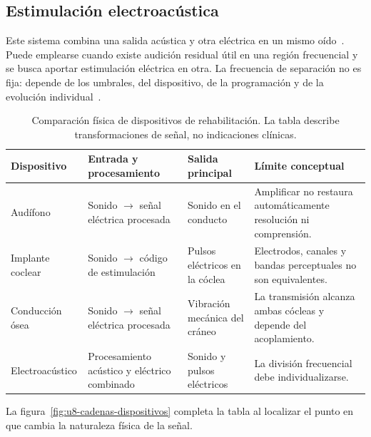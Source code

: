 \subsection{Estimulación electroacústica}
\label{sec:u8-eas}

Este sistema combina una salida acústica y otra eléctrica en un mismo oído~\cite{nidcdCI2024,whoHearing2021}.
Puede emplearse cuando existe audición
residual útil en una región frecuencial y se busca aportar estimulación
eléctrica en otra. La frecuencia de separación no es fija: depende de los
umbrales, del dispositivo, de la programación y de la evolución individual~\cite{nidcdCI2024,whoHearing2021}.

\begin{table}[htbp]
    \centering
    \caption{Comparación física de dispositivos de rehabilitación. La tabla
    describe transformaciones de señal, no indicaciones clínicas.}
    \label{tab:u8-dispositivos}
    \small
    \setlength{\tabcolsep}{3pt}
    \begin{tabular}{
        >{\raggedright\arraybackslash}p{}
        >{\raggedright\arraybackslash}p{}
        >{\raggedright\arraybackslash}p{}
        >{\raggedright\arraybackslash}p{}}
        \hline
        \textbf{Dispositivo} & \textbf{Entrada y procesamiento} &
        \textbf{Salida principal} & \textbf{Límite conceptual} \\
        \hline
        Audífono &
        Sonido \(\rightarrow\) señal eléctrica procesada &
        Sonido en el conducto &
        Amplificar no restaura automáticamente resolución ni comprensión. \\
        Implante coclear &
        Sonido \(\rightarrow\) código de estimulación &
        Pulsos eléctricos en la cóclea &
        Electrodos, canales y bandas perceptuales no son equivalentes. \\
        Conducción ósea &
        Sonido \(\rightarrow\) señal eléctrica procesada &
        Vibración mecánica del cráneo &
        La transmisión alcanza ambas cócleas y depende del acoplamiento. \\
        Electroacústico &
        Procesamiento acústico y eléctrico combinado &
        Sonido y pulsos eléctricos &
        La división frecuencial debe individualizarse. \\
        \hline
    \end{tabular}
\end{table}

La figura~\ref{fig:u8-cadenas-dispositivos} completa la tabla al localizar el
punto en que cambia la naturaleza física de la señal.

